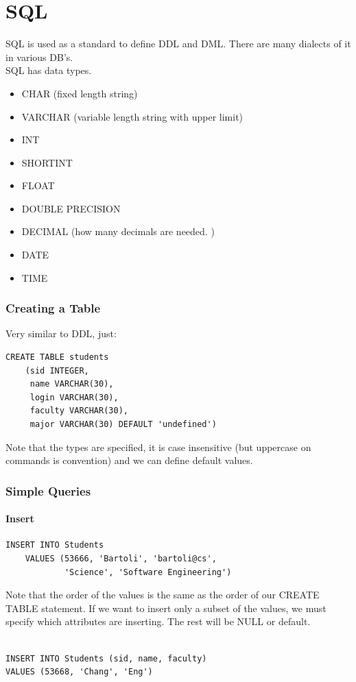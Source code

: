 \documentclass[12pt]{article}
\theoremstyle{definition}
\begin{document}
\part{SQL}
SQL is used as a standard to define DDL and DML. There are many dialects of it in various DB's.
\\ \linebreak
SQL has data types.
\begin{itemize}
	\item CHAR (fixed length string)
	\item VARCHAR (variable length string with upper limit)
	\item INT
	\item SHORTINT
	\item FLOAT
	\item DOUBLE PRECISION
	\item DECIMAL (how many decimals are needed. )
	\item DATE
	\item TIME
\end{itemize}

\section{Creating a Table}
Very similar to DDL, just:
\begin{lstlisting}
CREATE TABLE students
	(sid INTEGER,
	 name VARCHAR(30),
	 login VARCHAR(30),
	 faculty VARCHAR(30),
	 major VARCHAR(30) DEFAULT 'undefined')
\end{lstlisting}
Note that the types are specified, it is case insensitive (but uppercase on commands is convention) and we can define default values.
\section{Simple Queries}
\subsection{Insert}
\begin{lstlisting}
INSERT INTO Students
	VALUES (53666, 'Bartoli', 'bartoli@cs', 
		    'Science', 'Software Engineering')
\end{lstlisting}
Note that the order of the values is the same as the order of our CREATE TABLE statement. If we want to insert only a subset of the values, we must specify which attributes are inserting. The rest will be NULL or default.
\begin{lstlisting}

INSERT INTO Students (sid, name, faculty)
VALUES (53668, 'Chang', 'Eng')
\end{lstlisting}
\end{document}
